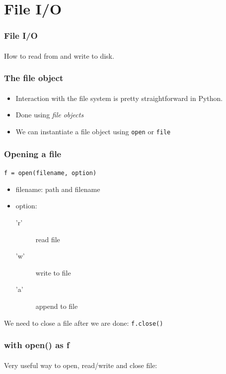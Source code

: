 \section{File I/O} %
\label{sec:file_i_o}

\begin{frame}\frametitle{File I/O}
    \framesubtitle{}

    How to read from and write to disk.

\end{frame}

\begin{frame}\frametitle{The file object}
    \framesubtitle{}

    \begin{itemize}
        \item Interaction with the file system is pretty straightforward in Python.
        \item Done using \emph{file objects}
        \item We can instantiate a file object using \texttt{open} or \texttt{file}
    \end{itemize}

\end{frame}

\begin{frame}\frametitle{Opening a file}
    \framesubtitle{}

    \texttt{f = open(filename, option)}

    \vfill

    \begin{itemize}
        \item filename: path and filename
        \item option:
            \begin{description}
                \item['r'] read file
                \item['w'] write to file
                \item['a'] append to file
            \end{description}
    \end{itemize}

    \vfill

    We need to close a file after we are done:
    \texttt{f.close()}

\end{frame}

\begin{frame}\frametitle{with open() as f}
    \framesubtitle{}

    Very useful way to open, read/write and close file:

\end{frame}

